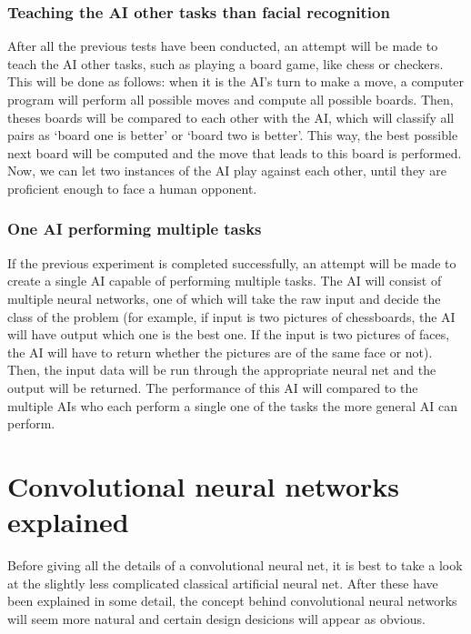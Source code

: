 \documentclass[12pt, titlepage]{article}
\let\oldsection\section
\renewcommand\section{\clearpage\oldsection}
\begin{document}
    \subsubsection{Teaching the AI other tasks than facial recognition}
    After all the previous tests have been conducted, an attempt will be made to teach the AI other tasks, such as playing a board game, like chess or checkers. This will be done as follows: when it is the AI’s turn to make a move, a computer program will perform all possible moves and compute all possible boards. Then, theses boards will be compared to each other with the AI, which will classify all pairs as ‘board one is better’ or ‘board two is better’. This way, the best possible next board will be computed and the move that leads to this board is performed. Now, we can let two instances of the AI play against each other, until they are proficient enough to face a human opponent.
    
    \subsubsection{One AI performing multiple tasks}
    If the previous experiment is completed successfully, an attempt will be made to create a single AI capable of performing multiple tasks. The AI will consist of multiple neural networks, one of which will take the raw input and decide the class of the problem (for example, if input is two pictures of chessboards, the AI will have output which one is the best one. If the input is two pictures of faces, the AI will have to return whether the pictures are of the same face or not). Then, the input data will be run through the appropriate neural net and the output will be returned. The performance of this AI will compared to the multiple AIs who each perform a single one of the tasks the more general AI can perform.
    
    \section{Convolutional neural networks explained}
    Before giving all the details of a convolutional neural net, it is best to take a look at the slightly less complicated classical artificial neural net. After these have been explained in some detail, the concept behind convolutional neural networks will seem more natural and certain design desicions will appear as obvious.
    
\end{document}
